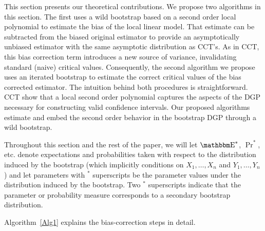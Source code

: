 \documentclass[12pt,fleqn]{article}
\begin{document}
This section presents our theoretical contributions. We propose two algorithms
in this section. The first uses a wild bootstrap based on a second
order local polynomial to estimate the bias of the local linear model. That
estimate can be subtracted from the biased original estimator to provide an
asymptotically unbiased estimator with the same asymptotic distribution as
CCT's. As in CCT, this bias correction term introduces a new source of variance,
invalidating standard (naive) critical values. Consequently, the second
algorithm we propose uses an iterated bootstrap to estimate the correct
critical values of the bias corrected estimator.
The intuition behind both procedures is straightforward. CCT show that a
local second order polynomial captures the aspects of the DGP
necessary for constructing valid confidence intervals. Our proposed algorithms
estimate and embed the second order behavior in the bootstrap DGP through a
wild bootstrap.

Throughout this section and the rest of the paper, we will
let $\E^{*}$, $\Pr^{*}$, etc. denote expectations and probabilities taken with
respect to the distribution induced by the bootstrap (which implicitly
conditions on $X_{1},\dots,X_{n}$ and $Y_{1},\dots,Y_{n}$) and let parameters with
$^{*}$ superscripts be the parameter values under the distribution induced by
the bootstrap. Two $^{*}$ superscripts indicate that the parameter or probability
measure corresponds to a secondary bootstrap distribution.

Algorithm~\ref{Alg1} explains the bias-correction steps in detail.
\end{document}
